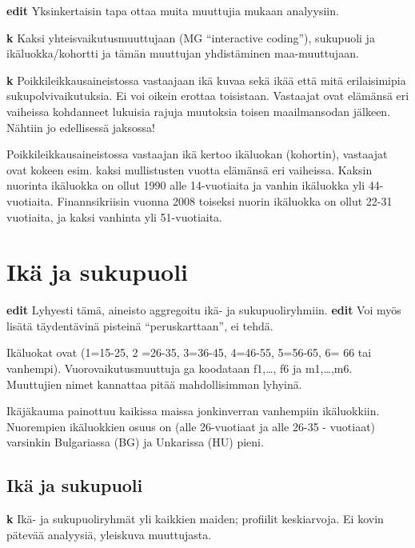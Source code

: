 \documentclass[
  finnish,
]{book}
\begin{document}
\textbf{edit} Yksinkertaisin tapa ottaa muita muuttujia mukaan
analyysiin.

\textbf{k} Kaksi yhteisvaikutusmuuttujaan (MG ``interactive coding''),
sukupuoli ja ikäluokka/kohortti ja tämän muuttujan yhdistäminen
maa-muuttujaan.

\textbf{k} Poikkileikkausaineistossa vastaajaan ikä kuvaa sekä ikää että
mitä erilaisimipia sukupolvivaikutuksia. Ei voi oikein erottaa
toisistaan. Vastaajat ovat elämänsä eri vaiheissa kohdanneet lukuisia
rajuja muutoksia toisen maailmansodan jälkeen. Nähtiin jo edellisessä
jaksossa!

Poikkileikkausaineistossa vastaajan ikä kertoo ikäluokan (kohortin),
vastaajat ovat kokeen esim. kaksi mullistusten vuotta elämänsä eri
vaiheissa. Kaksin nuorinta ikäluokka on ollut 1990 alle 14-vuotiaita ja
vanhin ikäluokka yli 44-vuotiaita. Finannsikriisin vuonna 2008 toiseksi
nuorin ikäluokka on ollut 22-31 vuotiaita, ja kaksi vanhinta yli
51-vuotiaita.

\hypertarget{ikuxe4-ja-sukupuoli}{%
\section{Ikä ja sukupuoli}\label{ikuxe4-ja-sukupuoli}}

\textbf{edit} Lyhyesti tämä, aineisto aggregoitu ikä- ja
sukupuoliryhmiin. \textbf{edit} Voi myös lisätä täydentävinä pisteinä
``peruskarttaan'', ei tehdä.

Ikäluokat ovat (1=15-25, 2 =26-35, 3=36-45, 4=46-55, 5=56-65, 6= 66 tai
vanhempi). Vuorovaikutusmuuttuja ga koodataan f1,\ldots, f6 ja
m1,\ldots,m6. Muuttujien nimet kannattaa pitää mahdollisimman lyhyinä.

Ikäjäkauma painottuu kaikissa maissa jonkinverran vanhempiin
ikäluokkiin. Nuorempien ikäluokkien osuus on (alle 26-vuotiaat ja alle
26-35 - vuotiaat) varsinkin Bulgariassa (BG) ja Unkarissa (HU) pieni.

\hypertarget{ikuxe4-ja-sukupuoli-1}{%
\subsection{Ikä ja sukupuoli}\label{ikuxe4-ja-sukupuoli-1}}

\textbf{k} Ikä- ja sukupuoliryhmät yli kaikkien maiden; profiilit
keskiarvoja. Ei kovin pätevää analyysiä, yleiskuva muuttujasta.
\end{document}
